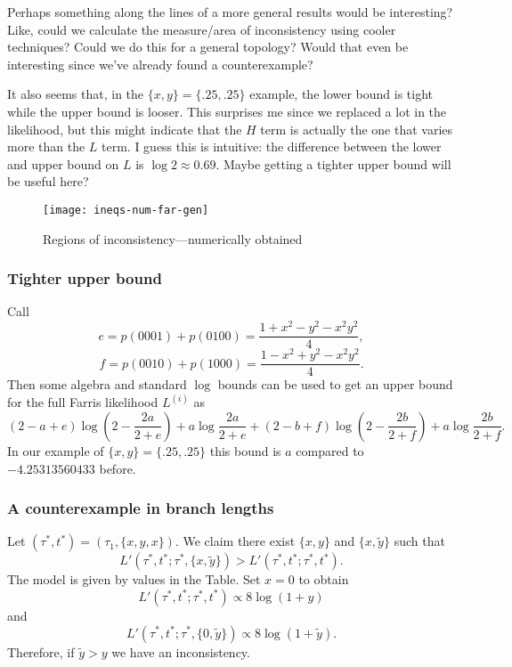 Perhaps something along the lines of a more general results would be interesting?
Like, could we calculate the measure/area of inconsistency using cooler techniques?
Could we do this for a general topology?
Would that even be interesting since we've already found a counterexample?

It also seems that, in the $\{x, y\}=\{.25, .25\}$ example, the lower bound is tight while the upper bound is looser.
This surprises me since we replaced a lot in the likelihood, but this might indicate that the $H$ term is actually the one that varies more than the $L$ term.
I guess this is intuitive: the difference between the lower and upper bound on $L$ is $\log2\approx0.69$.
Maybe getting a tighter upper bound will be useful here?

\begin{figure}
\centering
\texttt{[image: ineqs-num-far-gen]}
\caption{Regions of inconsistency---numerically obtained}
\label{fig:numerical-inconsistency-farris}
\end{figure}

\subsubsection{Tighter upper bound}

Call
$$
e = p(0001) + p(0100) = \frac{1+x^2-y^2-x^2y^2}{4},
$$
$$
f = p(0010) + p(1000) = \frac{1-x^2+y^2-x^2y^2}{4}.
$$
Then some algebra and standard $\log$ bounds can be used to get an upper bound for the full Farris likelihood $L^{(i)}$ as
$$
(2-a+e)\log(2-\frac{2a}{2+e}) + a\log\frac{2a}{2+e} + (2-b+f)\log(2-\frac{2b}{2+f}) + a\log\frac{2b}{2+f}.
$$
In our example of $\{x,y\}=\{.25,.25\}$ this bound is $a$ compared to $-4.25313560433$ before.


\subsubsection{A counterexample in branch lengths}

Let $(\tau^*, t^*)=(\tau_1, \{x,y,x\})$.
We claim there exist $\{x,y\}$ and $\{x, \tilde{y}\}$ such that
$$
L'(\tau^*, t^*; \tau^*, \{x, \tilde{y}\}) > L'(\tau^*, t^*; \tau^*, t^*).
$$
The model is given by values in the Table.
Set $x=0$ to obtain
$$
L'(\tau^*, t^*; \tau^*, t^*) \propto 8\log(1+y)
$$
and
$$
L'(\tau^*, t^*; \tau^*, \{0, \tilde{y}\}) \propto 8\log(1+\tilde{y}).
$$
Therefore, if $\tilde{y} > y$ we have an inconsistency.

